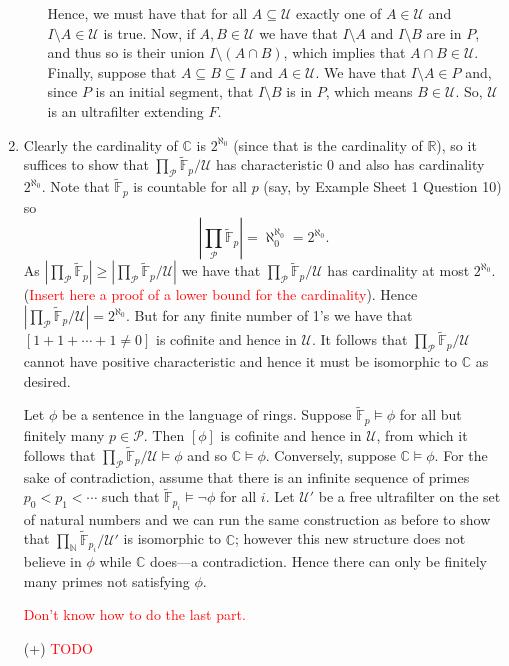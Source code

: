 \documentclass{article}
\theoremstyle{theorem}
\begin{document}
\begin{enumerate}[leftmargin=*]
\begin{enumerate}
				Hence, we must have that for all $A\subseteq \mathcal{U}$ exactly one of $A\in \mathcal{U}$ and $I\setminus A \in \mathcal{U}$ is true. Now, if $A,B\in \mathcal{U}$ we have that $I\setminus A$ and $I \setminus B$ are in $P$, and thus so is their union $I \setminus (A\cap B)$, which implies that $A\cap B \in \mathcal{U}$. Finally, suppose that $A\subseteq B\subseteq I$ and $A\in \mathcal{U}$. We have that $I\setminus A\in P$ and, since $P$ is an initial segment, that $I\setminus B$ is in $P$, which means $B\in \mathcal{U}$. So, $\mathcal{U}$ is an ultrafilter extending $F$.
			\end{enumerate}
			\item Clearly the cardinality of $\mathbb{C}$ is $2^{\aleph_0}$ (since that is the cardinality of $\mathbb{R}$), so it suffices to show that $\prod_{\mathcal{P}}\tilde{\mathbb{F}}_p/\mathcal{U}$ has characteristic 0 and also has cardinality $2^{\aleph_0}$. Note that $\tilde{\mathbb{F}}_p$ is countable for all $p$ (say, by Example Sheet 1 Question 10) so
			\[
				\left|\prod_{\mathcal{P}}\tilde{\mathbb{F}}_p \right| = \aleph_0^{\aleph_0} = 2^{\aleph_0}.
			\]
			As $\left|\prod_{\mathcal{P}}\tilde{\mathbb{F}}_p \right| \geq \left|\prod_{\mathcal{P}}\tilde{\mathbb{F}}_p/\mathcal{U}\right|$ we have that $\prod_{\mathcal{P}}\tilde{\mathbb{F}}_p/\mathcal{U}$ has cardinality at most $2^{\aleph_0}$. (\textcolor{red}{Insert here a proof of a lower bound for the cardinality}). Hence $\left|\prod_{\mathcal{P}}\tilde{\mathbb{F}}_p/\mathcal{U}\right| = 2^{\aleph_0}$. But for any finite number of 1's we have that $[1 + 1 +\cdots + 1 \neq 0]$ is cofinite and hence in $\mathcal{U}$. It follows that $\prod_{\mathcal{P}}\tilde{\mathbb{F}}_p/\mathcal{U}$ cannot have positive characteristic and hence it must be isomorphic to $\mathbb{C}$ as desired.
			
			Let $\phi$ be a sentence in the language of rings. Suppose $\tilde{\mathbb{F}}_p\models \phi$ for all but finitely many $p\in\mathcal{P}$. Then $[\phi]$ is cofinite and hence in $\mathcal{U}$, from which it follows that $\prod_{\mathcal{P}}\tilde{\mathbb{F}}_p/\mathcal{U}\models \phi$ and so $\mathbb{C}\models \phi$. Conversely, suppose $\mathbb{C}\models \phi$. For the sake of contradiction, assume that there is an infinite sequence of primes $p_0<p_1 < \cdots$ such that $\tilde{\mathbb{F}}_{p_i}\models \neg \phi$ for all $i$. Let $\mathcal{U}'$ be a free ultrafilter on the set of natural numbers and we can run the same construction as before to show that $\prod_{\mathbb{N}}\tilde{\mathbb{F}}_{p_i}/\mathcal{U'}$ is isomorphic to $\mathbb{C}$; however this new structure does not believe in $\phi$ while $\mathbb{C}$ does---a contradiction. Hence there can only be finitely many primes not satisfying $\phi$.
			
			\textcolor{red}{Don't know how to do the last part.}
			\item[(+)] \textcolor{red}{TODO}
			
	\end{enumerate}
\end{document}
